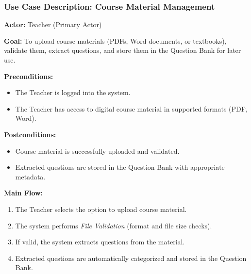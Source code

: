 \documentclass[12pt]{article}
\begin{document}
	\begin{center}
	\end{center}
	
	\subsubsection*{Use Case Description: Course Material Management}
	
	\textbf{Actor:} Teacher (Primary Actor)
	
	\textbf{Goal:}  
	To upload course materials (PDFs, Word documents, or textbooks), validate them, extract questions, and store them in the Question Bank for later use.
	
	\textbf{Preconditions:}
	\begin{itemize}
		\item The Teacher is logged into the system.
		\item The Teacher has access to digital course material in supported formats (PDF, Word).
	\end{itemize}
	
	\textbf{Postconditions:}
	\begin{itemize}
		\item Course material is successfully uploaded and validated.
		\item Extracted questions are stored in the Question Bank with appropriate metadata.
	\end{itemize}
	
	\textbf{Main Flow:}
	\begin{enumerate}
		\item The Teacher selects the option to upload course material.
		\item The system performs \textit{File Validation} (format and file size checks).
		\item If valid, the system extracts questions from the material.
		\item Extracted questions are automatically categorized and stored in the Question Bank.
	\end{enumerate}
	
\end{document}
